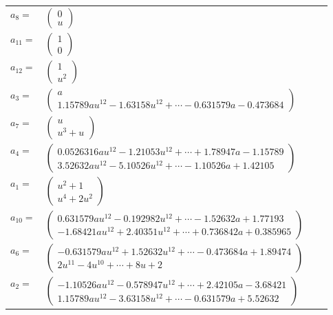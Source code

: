 \documentclass[1p]{elsarticle_modified}
\theoremstyle{definition}
\begin{document}
\begin{tabular}{m{7pt} m{180pt} m{7pt} m{180pt} }
\flushright $a_{8}=$&$\begin{pmatrix}0\\u\end{pmatrix}$ \\
\flushright $a_{11}=$&$\begin{pmatrix}1\\0\end{pmatrix}$ \\
\flushright $a_{12}=$&$\begin{pmatrix}1\\u^2\end{pmatrix}$ \\
\flushright $a_{3}=$&$\begin{pmatrix}a\\1.15789 a u^{12}-1.63158 u^{12}+\cdots-0.631579 a-0.473684\end{pmatrix}$ \\
\flushright $a_{7}=$&$\begin{pmatrix}u\\u^3+u\end{pmatrix}$ \\
\flushright $a_{4}=$&$\begin{pmatrix}0.0526316 a u^{12}-1.21053 u^{12}+\cdots+1.78947 a-1.15789\\3.52632 a u^{12}-5.10526 u^{12}+\cdots-1.10526 a+1.42105\end{pmatrix}$ \\
\flushright $a_{1}=$&$\begin{pmatrix}u^2+1\\u^4+2 u^2\end{pmatrix}$ \\
\flushright $a_{10}=$&$\begin{pmatrix}0.631579 a u^{12}-0.192982 u^{12}+\cdots-1.52632 a+1.77193\\-1.68421 a u^{12}+2.40351 u^{12}+\cdots+0.736842 a+0.385965\end{pmatrix}$ \\
\flushright $a_{6}=$&$\begin{pmatrix}-0.631579 a u^{12}+1.52632 u^{12}+\cdots-0.473684 a+1.89474\\2 u^{11}-4 u^{10}+\cdots+8 u+2\end{pmatrix}$ \\
\flushright $a_{2}=$&$\begin{pmatrix}-1.10526 a u^{12}-0.578947 u^{12}+\cdots+2.42105 a-3.68421\\1.15789 a u^{12}-3.63158 u^{12}+\cdots-0.631579 a+5.52632\end{pmatrix}$ \\

\end{tabular}
\end{document}
